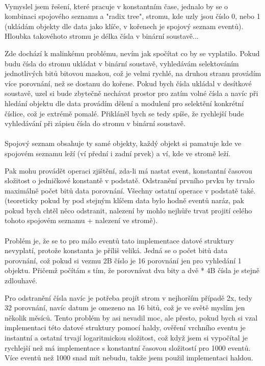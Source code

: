 \documentclass[12pt,a4paper]{report}
\begin{document}
\paragraph{}
Vymyslel jsem řešení, které pracuje v konstantním čase, jednalo by se o kombinaci spojového seznamu a "radix tree", stromu, kde uzly jsou číslo 0, nebo 1 (ukládám objekty dle data jako klíče, v kořenech je spojový seznam eventů). Hloubka takovéhoto stromu je délka čísla v binární soustavě...

Zde dochází k malinkému problému, nevím jak spočítat co by se vyplatilo. Pokud budu čísla do stromu ukládat v binární soustavě, vyhledávám selektováním jednotlivých  bitů bitovou maskou, což je velmi rychlé, na druhou stranu provádím více porovnání, než se dostanu do kořene. Pokud bych čísla ukládal v desítkové soustavě, uzel si bude zbytečně nechávat prostor pro zatím volné čísla a navíc při hledání objektu dle data provádím dělení a modulení pro selektění konkrétní číslice, což je extrémě pomalé. Přikláněl bych se tedy spíše, že rychlejší bude vyhledávání při zápisu čísla do stromu v binární soustavě.

\paragraph{}
Spojový seznam obsahuje ty samé objekty, každý objekt si pamatuje kde ve spojovém seznamu leží (ví přední i zadní prvek) a ví, kde ve stromě leží. 

Pak mohu provádět operaci zjištění, zda-li má nastat event, konstantní časovou složitost o jedničkové konstantě v podstatě. Odstranění prvního prvku by trvalo maximálně počet bitů data porovnání. Všechny ostatní operace v podstatě také. (teoreticky pokud by pod stejným klíčem data bylo hodně eventů naráz, pak pokud bych chtěl něco odstranit, nalezení by mohlo nejhůře trvat projití celého tohoto spojovém seznamu + nalezení ve stromě).

\paragraph{}
Problém je, že se to pro málo eventů tato implementace datové struktury nevyplatí, protože konstanta je příliš veliká. Jedná se o počet bitů data porovnání, což pokud si vezmu 2B číslo je 16 porovnání jen pro vyhledání 1 objektu. Přičemž počítám s tím, že porovnávat dva bity a dvě * 4B čísla je stejně zdlouhavé. 

Pro odstranění čísla navíc je potřeba projít strom v nejhorším případě 2x, tedy 32 porovnání, navíc datum je omezeno na 16 bitů, což je ve světě myslím jen několik měsíců. Tento problém by asi nevadil moc, ale přesto, pokud bych si vzal implementaci této datové struktury pomocí haldy, ověření vrchního eventu je instantní a ostatní trvají logaritmickou složitost, což když jsem si vypočítal je rychlejší než má implementace s konstantní časovou složitostí pro 1000 eventů. Více eventů než 1000 snad mít nebudu, takže jsem použil implementaci haldou.
\end{document}

